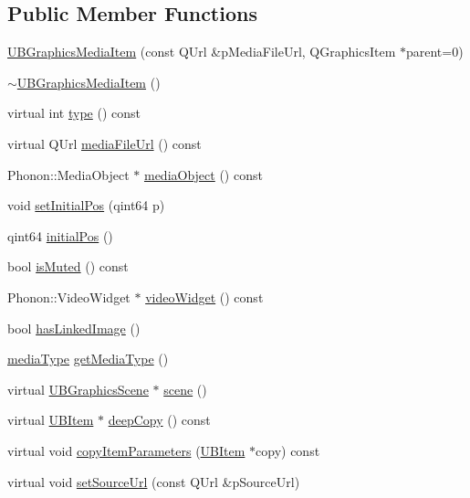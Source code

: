 \subsection*{Public Member Functions}
\begin{DoxyCompactItemize}
\item 
\hyperlink{class_u_b_graphics_media_item_aa92cf921e88af8b52b4c7ed6466dd2d5}{U\-B\-Graphics\-Media\-Item} (const Q\-Url \&p\-Media\-File\-Url, Q\-Graphics\-Item $\ast$parent=0)
\item 
\hyperlink{class_u_b_graphics_media_item_a609049e2f30232cc0454d1f71c84c4be}{$\sim$\-U\-B\-Graphics\-Media\-Item} ()
\item 
virtual int \hyperlink{class_u_b_graphics_media_item_a81a76ca0d217448f2b55ff72328b093c}{type} () const 
\item 
virtual Q\-Url \hyperlink{class_u_b_graphics_media_item_a8a26c3a782e9d2e3cd8227c679885dd6}{media\-File\-Url} () const 
\item 
Phonon\-::\-Media\-Object $\ast$ \hyperlink{class_u_b_graphics_media_item_acb9624b430d6dcf237200bdb86daf5d4}{media\-Object} () const 
\item 
void \hyperlink{class_u_b_graphics_media_item_a56ddbb8c3e4bbb60539ff6d4e96146f0}{set\-Initial\-Pos} (qint64 p)
\item 
qint64 \hyperlink{class_u_b_graphics_media_item_ab2b9d87a734ede93dbfa53251910eec1}{initial\-Pos} ()
\item 
bool \hyperlink{class_u_b_graphics_media_item_a2197d836aacff8b553e2941c599d5ceb}{is\-Muted} () const 
\item 
Phonon\-::\-Video\-Widget $\ast$ \hyperlink{class_u_b_graphics_media_item_a6a0b789cc622eaf3bbe25a2d29547172}{video\-Widget} () const 
\item 
bool \hyperlink{class_u_b_graphics_media_item_a6b5fc1ebe5777157c78afa77b7d1d226}{has\-Linked\-Image} ()
\item 
\hyperlink{class_u_b_graphics_media_item_acf0611c604c6a618b1b920389c3ae6f6}{media\-Type} \hyperlink{class_u_b_graphics_media_item_ab226c5a7da2a694b0b341a49d1900c5f}{get\-Media\-Type} ()
\item 
virtual \hyperlink{class_u_b_graphics_scene}{U\-B\-Graphics\-Scene} $\ast$ \hyperlink{class_u_b_graphics_media_item_a5b064d18526d1ed0eee805d35fdaa679}{scene} ()
\item 
virtual \hyperlink{class_u_b_item}{U\-B\-Item} $\ast$ \hyperlink{class_u_b_graphics_media_item_a8adbf02f86a23b2d2884efe8855e0556}{deep\-Copy} () const 
\item 
virtual void \hyperlink{class_u_b_graphics_media_item_a1fea58ac7234a2090777c67d2a88e5f4}{copy\-Item\-Parameters} (\hyperlink{class_u_b_item}{U\-B\-Item} $\ast$copy) const 
\item 
virtual void \hyperlink{class_u_b_graphics_media_item_a36a57baf502db973b4541db3f2479731}{set\-Source\-Url} (const Q\-Url \&p\-Source\-Url)
\end{DoxyCompactItemize}
